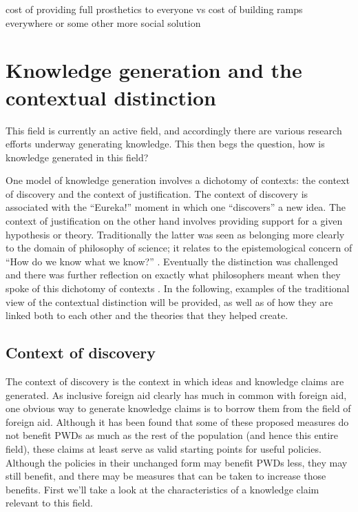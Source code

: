 \documentclass[a4paper]{article}
\begin{document}
cost of providing full prosthetics to everyone vs cost of building ramps
everywhere or some other more social solution


\newpage
\section{Knowledge generation and the contextual distinction}

This field is currently an active field, and accordingly there are various
research efforts underway generating knowledge. This then begs the question,
how is knowledge generated in this field?


One model of knowledge generation involves a dichotomy of contexts: the
context of discovery and the context of justification. The context of
discovery is associated with the ``Eureka!'' moment in which one ``discovers''
a new idea. The context of justification on the other hand involves providing
support for a given hypothesis or theory. Traditionally the latter was seen as
belonging more clearly to the domain of philosophy of science; it relates to
the epistemological concern of ``How do we know what we know?''
\citep{schickore2014scientific}. Eventually the distinction was challenged and
there was further reflection on exactly what philosophers meant when they
spoke of this dichotomy of contexts \citep{hoyningen2006context}. In the
following, examples of the traditional view of the contextual distinction will
be provided, as well as of how they are linked both to each other and the
theories that they helped create.

\subsection{Context of discovery}

The context of discovery is the context in which ideas and knowledge claims
are generated. As inclusive foreign aid clearly has much in common with
foreign aid, one obvious way to generate knowledge claims is to borrow them
from the field of foreign aid. Although it has been found that some of these
proposed measures do not benefit PWDs as much as the rest of the population
(and hence this entire field), these claims at least serve as valid starting
points for useful policies. Although the policies in their unchanged form may
benefit PWDs less, they may still benefit, and there may be measures that can
be taken to increase those benefits. First we'll take a look at the
characteristics of a knowledge claim relevant to this field.
\end{document}
